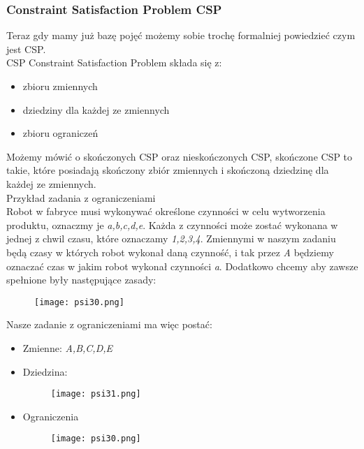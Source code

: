 \documentclass[a4paper,15pt]{article}
\begin{document}
\subsubsection{Constraint Satisfaction Problem CSP}

Teraz gdy mamy już bazę pojęć możemy sobie trochę formalniej powiedzieć czym jest CSP. \\

CSP Constraint Satisfaction Problem składa się z:
\begin{itemize}
\item zbioru zmiennych
\item dziedziny dla każdej ze zmiennych
\item zbioru ograniczeń
\end{itemize}

Możemy mówić o skończonych CSP oraz nieskończonych CSP, skończone CSP to takie, które posiadają skończony zbiór zmiennych i skończoną dziedzinę dla każdej ze zmiennych. \\

Przykład zadania z ograniczeniami \\

Robot w fabryce musi wykonywać określone czynności w celu wytworzenia produktu, oznaczmy je \textit{a,b,c,d,e}. Każda z czynności może zostać wykonana w jednej z chwil czasu, które oznaczamy \textit{1,2,3,4}. Zmiennymi w naszym zadaniu będą czasy w których robot wykonał daną czynność, i tak przez \textit{A} będziemy oznaczać czas w jakim robot wykonał czynności \textit{a}. Dodatkowo chcemy aby zawsze spełnione były następujące zasady: 

\begin{figure}[H]
\centerline{\texttt{[image: psi30.png]}}
\end{figure}

Nasze zadanie z ograniczeniami ma więc postać: \\
\begin{itemize}
\item Zmienne: \textit{A,B,C,D,E}
\item Dziedzina: 
\begin{figure}[H]
\centerline{\texttt{[image: psi31.png]}}
\end{figure}
\item Ograniczenia
\begin{figure}[H]
\centerline{\texttt{[image: psi30.png]}}
\end{figure}
\end{itemize}
\end{document}
